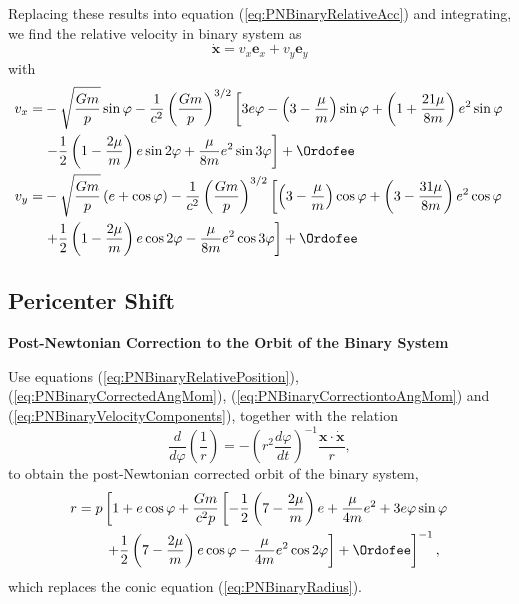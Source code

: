 Replacing these results into equation (\ref{eq:PNBinaryRelativeAcc}) and integrating, we find the relative velocity in binary system as
\begin{equation}
 \dot{\textbf{x}} = v_x \textbf{e}_x + v_y \textbf{e}_y
 \end{equation} 
 with
 \begin{subequations}\label{eq:PNBinaryVelocityComponents}
 \begin{align}
 v_x = &-\sqrt{\frac{Gm}{p}} \sin \varphi
 - \frac{1}{c^2} \left( \frac{Gm}{p} \right)^{3/2}  \left[ 3e\varphi - \left( 3 - \frac{\mu}{m} \right)\sin \varphi + \left( 1 + \frac{21\mu}{8m} \right) e^2 \sin \varphi \right. \notag \\  
 & \left. -\frac{1}{2} \left( 1 - \frac{2\mu}{m} \right)e \sin 2 \varphi + \frac{\mu}{8m} e^2 \sin 3 \varphi\right] + \Ordofee \\
 v_y = &-\sqrt{\frac{Gm}{p}} \left( e + \cos \varphi \right ) - \frac{1}{c^2} \left( \frac{Gm}{p} \right)^{3/2} \left[  \left( 3 - \frac{\mu}{m} \right)\cos \varphi + \left( 3 - \frac{31\mu}{8m} \right) e^2 \cos \varphi  \right .  \notag \\
 & \left. + \frac{1}{2} \left( 1 - \frac{2\mu}{m} \right)e \cos 2 \varphi - \frac{\mu}{8m} e^2 \cos 3 \varphi\right] + \Ordofee
 \end{align}
 \end{subequations}
 
\subsection{Pericenter Shift}

\begin{exercise}
\textbf{Post-Newtonian Correction to the Orbit of the Binary System}

Use equations (\ref{eq:PNBinaryRelativePosition}),(\ref{eq:PNBinaryCorrectedAngMom}), (\ref{eq:PNBinaryCorrectiontoAngMom}) and (\ref{eq:PNBinaryVelocityComponents}), together with the relation
\begin{equation}
\frac{d}{d\varphi} \left( \frac{1}{r} \right) = - \left( r^2 \frac{d\varphi}{dt} \right)^{-1} \frac{\textbf{x} \cdot \dot{\textbf{x}}}{r},
\end{equation}
to obtain the post-Newtonian corrected orbit of the binary system,
\begin{align}
r = p & \left[ 1 + e \cos \varphi + \frac{Gm}{c^2 p}  \left[  -\frac{1}{2} \left( 7 - \frac{2\mu}{m} \right) e  + \frac{\mu}{4m} e^2 + 3 e \varphi \sin \varphi \right. \right. \notag \\
& \left. \left. + \frac{1}{2} \left(7 - \frac{2\mu}{m} \right) e \cos \varphi - \frac{\mu}{4m} e^2 \cos 2\varphi   \right] + \Ordofee \right]^{-1} , \label{eq:PNBinaryCorrectedConic}
\end{align}
which replaces the conic equation (\ref{eq:PNBinaryRadius}).
\end{exercise}

